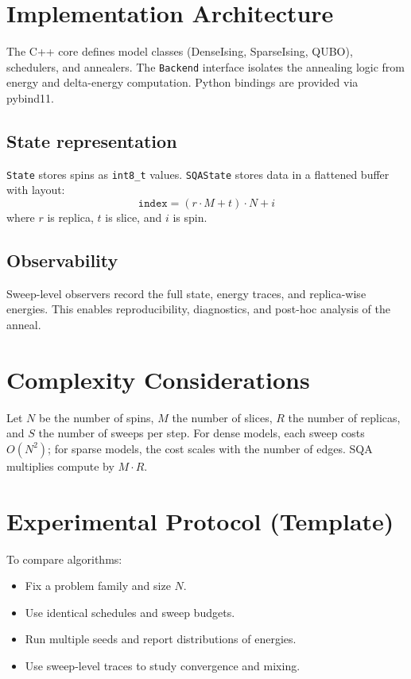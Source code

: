 \documentclass[11pt]{article}
\begin{document}
\section{Implementation Architecture}
The C++ core defines model classes (DenseIsing, SparseIsing, QUBO), schedulers, and annealers. The \texttt{Backend} interface isolates the annealing logic from energy and delta-energy computation. Python bindings are provided via pybind11.

\subsection{State representation}
\texttt{State} stores spins as \texttt{int8\_t} values. \texttt{SQAState} stores data in a flattened buffer with layout:
\begin{equation}
\texttt{index} = (r \cdot M + t) \cdot N + i
\end{equation}
where $r$ is replica, $t$ is slice, and $i$ is spin.

\subsection{Observability}
Sweep-level observers record the full state, energy traces, and replica-wise energies. This enables reproducibility, diagnostics, and post-hoc analysis of the anneal.

\section{Complexity Considerations}
Let $N$ be the number of spins, $M$ the number of slices, $R$ the number of replicas, and $S$ the number of sweeps per step. For dense models, each sweep costs $O(N^2)$; for sparse models, the cost scales with the number of edges. SQA multiplies compute by $M \cdot R$.

\section{Experimental Protocol (Template)}
To compare algorithms:
\begin{itemize}
\item Fix a problem family and size $N$.
\item Use identical schedules and sweep budgets.
\item Run multiple seeds and report distributions of energies.
\item Use sweep-level traces to study convergence and mixing.
\end{itemize}
\end{document}
